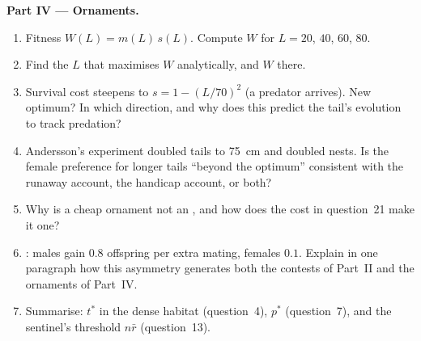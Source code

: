 \begin{problem}
\medskip
\noindent\textbf{Part IV --- Ornaments.}
\begin{enumerate}[resume]
  \item Fitness $W(L) = m(L)\,s(L)$. Compute $W$ for $L = 20$, $40$, $60$,
        $80$.
  \item Find the $L$ that maximises $W$ analytically, and $W$ there.
  \item Survival cost steepens to $s = 1 - (L/70)^{2}$ (a predator
        arrives). New optimum? In which direction, and why does this
        predict the tail's evolution to track predation?
  \item Andersson's experiment doubled tails to \qty{75}{cm} and doubled
        nests. Is the female preference for longer tails ``beyond the
        optimum'' consistent with the runaway account, the handicap
        account, or both?
  \item Why is a cheap ornament not an , and how does the
        cost in question~21 make it one?
  \item {}: males gain $0.8$ offspring per extra mating,
        females $0.1$. Explain in one paragraph how this asymmetry
        generates both the contests of Part~II and the ornaments of
        Part~IV.
  \item Summarise: $t^{*}$ in the dense habitat (question~4), $p^{*}$
        (question~7), and the sentinel's threshold $n\bar r$
        (question~13).
\end{enumerate}
\end{problem}
